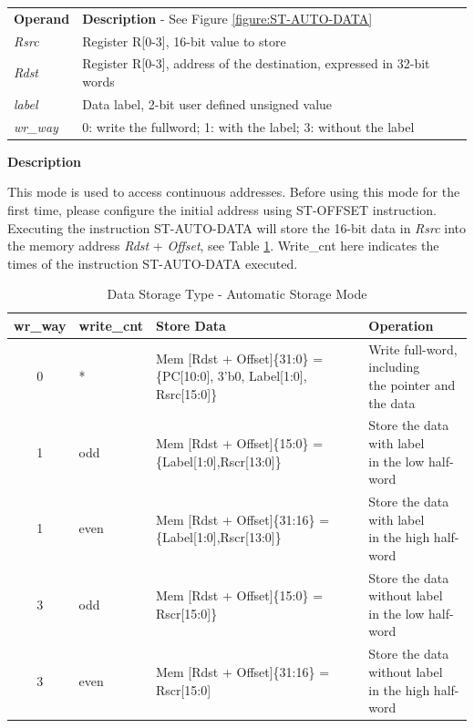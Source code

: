 \documentclass[main\_\_EN.tex]{subfiles}
\begin{document}
\begin{tabular}{ l l }
\textbf{Operand} & \textbf{Description} - See Figure \ref{figure:ST-AUTO-DATA} \\
\textit{Rsrc} & Register R[0-3], 16-bit value to store\\
\textit{Rdst} & Register R[0-3], address of the destination, expressed in 32-bit words \\
\textit{label} & Data label, 2-bit user defined unsigned value\\
\textit{wr\_way} & 0: write the fullword; 1: with the label; 3: without the label
\end{tabular}

\textbf{Description}

This mode is used to access continuous addresses. Before using this mode for the first time, please configure the initial address using ST-OFFSET instruction. Executing the instruction ST-AUTO-DATA will store the 16-bit data in \textit{Rsrc} into the memory address \textit{Rdst} + \textit{Offset}, see Table \ref{table:data_format-with-write_way-auto}. Write\_cnt here indicates the times of the instruction ST-AUTO-DATA executed. \\

\begin{table}[!ht ]
    \centering
    \begin{tabular}{ c l l l }
    \textbf{wr\_way}  & \textbf{write\_cnt} & \textbf{Store Data} & \textbf{Operation}  \\ \hline
    0 &*&Mem [Rdst + Offset]\{31:0\} =\{PC[10:0], 3'b0, Label[1:0], Rsrc[15:0]\}  & \makecell[tl]{Write full-word, including  \\ the pointer and the data} \\
    1 & odd & Mem [Rdst + Offset]\{15:0\}  = \{Label[1:0],Rscr[13:0]\} &  \makecell[tl]{Store the data with label  \\ in the low half-word} \\
    1 & even & Mem [Rdst + Offset]\{31:16\} = \{Label[1:0],Rscr[13:0]\} & \makecell[tl]{Store the data with label \\ in the high half-word}\\
    3 & odd & Mem [Rdst + Offset]\{15:0\}  = Rscr[15:0]\}& \makecell[tl]{Store the data without label  \\ in the low half-word}  \\
    3 & even & Mem [Rdst + Offset]\{31:16\} = Rscr[15:0] & \makecell[tl]{Store the data without label  \\ in the high half-word}   \\
    \end{tabular}
    \caption{Data Storage Type - Automatic Storage Mode}
    \label{table:data_format-with-write_way-auto}
\end{table}
~
\end{document}
